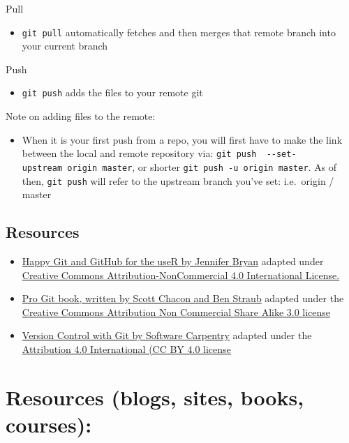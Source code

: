\documentclass[
]{book}
\providecommand{\tightlist}{%
  \setlength{\itemsep}{0pt}\setlength{\parskip}{0pt}}
\begin{document}
Pull

\begin{itemize}
\tightlist
\item
  \texttt{git\ pull} automatically fetches and then merges that remote branch into your current branch
\end{itemize}

Push

\begin{itemize}
\tightlist
\item
  \texttt{git\ push} adds the files to your remote git
\end{itemize}

Note on adding files to the remote:

\begin{itemize}
\tightlist
\item
  When it is your first push from a repo, you will first have to make the link between the local and remote repository via: \texttt{git\ push\ \ -\/-set-upstream\ origin\ master}, or shorter \texttt{git\ push\ -u\ origin\ master}. As of then, \texttt{git\ push} will refer to the upstream branch you've set: i.e.~origin / master
\end{itemize}

\hypertarget{resources}{%
\section{Resources}\label{resources}}

\begin{itemize}
\tightlist
\item
  \href{http://happygitwithr.com/rmd-test-drive.html}{Happy Git and GitHub for the useR by Jennifer Bryan} adapted under \href{https://creativecommons.org/licenses/by/4.0/}{Creative Commons Attribution-NonCommercial 4.0 International License.}
\item
  \href{https://git-scm.com/book/en/v2}{Pro Git book, written by Scott Chacon and Ben Straub} adapted under the \href{https://creativecommons.org/licenses/by/3.0/}{Creative Commons Attribution Non Commercial Share Alike 3.0 license}
\item
  \href{http://swcarpentry.github.io/git-novice/}{Version Control with Git by Software Carpentry} adapted under the \href{https://creativecommons.org/licenses/by/4.0/}{Attribution 4.0 International (CC BY 4.0 license}
\end{itemize}

\hypertarget{resources-blogs-sites-books-courses}{%
\chapter{Resources (blogs, sites, books, courses):}\label{resources-blogs-sites-books-courses}}
\end{document}
